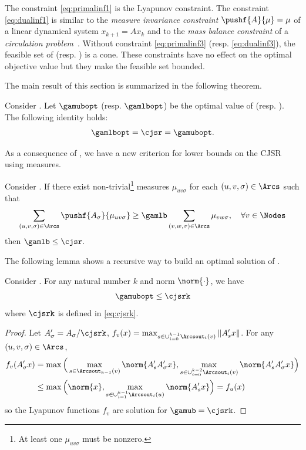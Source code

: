 \documentclass[11pt,twoside,a4paper,openright]{uclouvain-thesis}
\begin{document}
The constraint \eqref{eq:primalinf1} is the Lyapunov constraint.
The constraint \eqref{eq:dualinf1} is similar to the \emph{measure invariance constraint} $\pushf{A}{\mu} = \mu$ of a linear dynamical system $x_{k+1} = Ax_k$
and to the \emph{mass balance constraint} of a \emph{circulation problem}~\cite{ahuja1993network}.
Without constraint \eqref{eq:primalinf3} (resp. \eqref{eq:dualinf3}), the feasible set of  (resp. ) is a cone.
These constraints have no effect on the optimal objective value but they make the feasible set bounded.

The main result of this section is summarized in the following theorem.

\begin{mytheo}
  \label{theo:exact}
  Consider .
    Let $\gamubopt$ (resp. $\gamlbopt$) be the optimal value of  (resp. ).
  The following identity holds:
  \[ \gamlbopt = \cjsr = \gamubopt. \]
\end{mytheo}

As a consequence of , we have a new criterion for lower bounds on the CJSR using measures.
\begin{mycoro}
  \label{coro:instabcert}
  Consider .
  If there exist non-trivial\footnote{At least one $\mu_{uv\sigma}$ must be nonzero.} measures $\mu_{uv\sigma}$ for each $(u,v,\sigma) \in \Arcs$ such that
  \[ \sum_{(u,v,\sigma) \in \Arcs} \pushf{A_{\sigma}}{\mu_{uv\sigma}} \geq \gamlb \sum_{(v,w,\sigma) \in \Arcs} \mu_{vw\sigma}, \quad \forall v \in \Nodes \]
  then
  \( \gamlb \leq \cjsr. \)
\end{mycoro}


The following lemma shows a recursive way to build an optimal solution of .

\begin{mylem}
    \label{lem:primalbuild}
    Consider .
    For any natural number $k$ and norm $\norm{\cdot}$, we have
    \[ \gamubopt \leq \cjsrk \]
    where $\cjsrk$ is defined in \eqref{eq:cjsrk}.
    \begin{proof}
        Let $A'_\sigma = A_\sigma/\cjsrk$, $f_v(x) = \max_{s \in \cup_{i=0}^{k-1}\Arcsout_i(v)} \|A'_s x\|$.
        For any \arc{} $(u,v,\sigma) \in \Arcs$,
        \begin{align*}
          f_v(A'_\sigma x)
          & =
          \max\Big(\max_{s \in \Arcsout_{k-1}(v)} \norm{A'_sA'_\sigma x}, \max_{s \in \cup_{i=0}^{k-2} \Arcsout_i(v)} \norm{A'_sA'_\sigma x} \Big)\\
          & \leq
          \max\Big(\norm{x}, \max_{s \in \cup_{i=1}^{k-1} \Arcsout_i(u)} \norm{A'_s x} \Big)
          = f_u(x)
        \end{align*}
        so the Lyapunov functions $f_v$ are solution for $\gamub = \cjsrk$.
    \end{proof}
\end{mylem}
\end{document}
